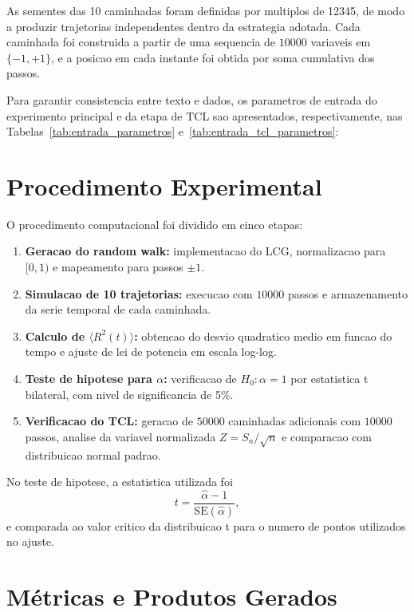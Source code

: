 As sementes das 10 caminhadas foram definidas por multiplos de 12345, de modo a produzir trajetorias independentes dentro da estrategia adotada. Cada caminhada foi construida a partir de uma sequencia de $10000$ variaveis em $\{-1,+1\}$, e a posicao em cada instante foi obtida por soma cumulativa dos passos.

Para garantir consistencia entre texto e dados, os parametros de entrada do experimento principal e da etapa de TCL sao apresentados, respectivamente, nas Tabelas~\ref{tab:entrada_parametros} e~\ref{tab:entrada_tcl_parametros}:





\section{Procedimento Experimental}
\label{sec_procedimento_experimental}

O procedimento computacional foi dividido em cinco etapas:
\begin{enumerate}
    \item \textbf{Geracao do random walk:} implementacao do LCG, normalizacao para $[0,1)$ e mapeamento para passos $\pm 1$.
    \item \textbf{Simulacao de 10 trajetorias:} execucao com $10000$ passos e armazenamento da serie temporal de cada caminhada.
    \item \textbf{Calculo de $\langle R^2(t)\rangle$:} obtencao do desvio quadratico medio em funcao do tempo e ajuste de lei de potencia em escala log-log.
    \item \textbf{Teste de hipotese para $\alpha$:} verificacao de $H_0: \alpha=1$ por estatistica t bilateral, com nivel de significancia de 5\%.
    \item \textbf{Verificacao do TCL:} geracao de $50000$ caminhadas adicionais com $10000$ passos, analise da variavel normalizada $Z=S_n/\sqrt{n}$ e comparacao com distribuicao normal padrao.
\end{enumerate}

No teste de hipotese, a estatistica utilizada foi
\begin{equation}
t = \frac{\hat{\alpha}-1}{\text{SE}(\hat{\alpha})},
\end{equation}
e comparada ao valor critico da distribuicao t para o numero de pontos utilizados no ajuste.

\section{Métricas e Produtos Gerados}

